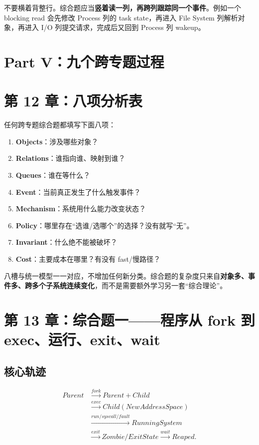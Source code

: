 \documentclass[11pt,a4paper]{ctexart}
\newcommand{\kw}[1]{\textbf{#1}}
\begin{document}
\begin{bridge}[看矩阵的方法]
不要横着背整行。综合题应当\kw{竖着读一列，再跨列跟踪同一个事件}。例如一个 blocking read 会先修改 Process 列的 task state，再进入 File System 列解析对象，再进入 I/O 列提交请求，完成后又回到 Process 列 wakeup。
\end{bridge}

\newpage
\section{Part V：九个跨专题过程}

\section{第 12 章：八项分析表}
任何跨专题综合题都填写下面八项：
\begin{enumerate}
  \item \kw{Objects}：涉及哪些对象？
  \item \kw{Relations}：谁指向谁、映射到谁？
  \item \kw{Queues}：谁在等什么？
  \item \kw{Event}：当前真正发生了什么触发事件？
  \item \kw{Mechanism}：系统用什么能力改变状态？
  \item \kw{Policy}：哪里存在“选谁/选哪个”的选择？没有就写“无”。
  \item \kw{Invariant}：什么绝不能被破坏？
  \item \kw{Cost}：主要成本在哪里？有没有 fast/慢路径？
\end{enumerate}

\begin{method}[为什么只用八槽]
八槽与统一模型一一对应，不增加任何新分类。综合题的复杂度只来自\kw{对象多、事件多、跨多个子系统连续变化}，而不是需要额外学习另一套“综合理论”。
\end{method}

\section{第 13 章：综合题一——程序从 fork 到 exec、运行、exit、wait}

\subsection{核心轨迹}
\[
\begin{aligned}
Parent&\xrightarrow{fork}Parent+Child\\
&\xrightarrow{exec}Child(NewAddressSpace)\\
&\xrightarrow{run/syscall/fault}RunningSystem\\
&\xrightarrow{exit}Zombie/ExitState\xrightarrow{wait}Reaped.
\end{aligned}
\]
\end{document}
